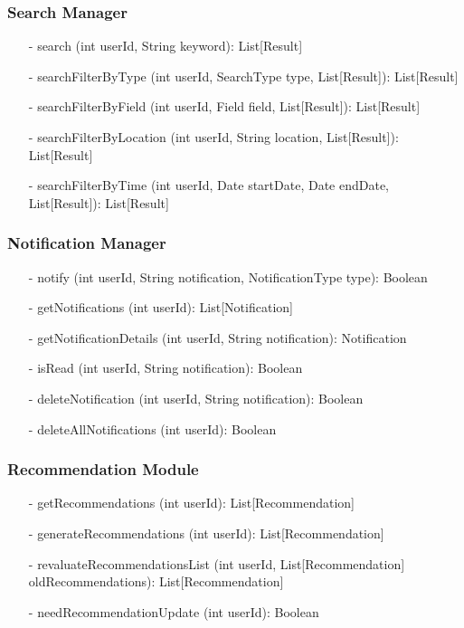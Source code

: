 \subsubsection{Search Manager}
\begin{itemize}
    \item[-] search (int userId, String keyword): List[Result]
    \item[-] searchFilterByType (int userId, SearchType type, List[Result]): List[Result]
    \item[-] searchFilterByField (int userId, Field field, List[Result]): List[Result]
    \item[-] searchFilterByLocation (int userId, String location, List[Result]): List[Result]
    \item[-] searchFilterByTime (int userId, Date startDate, Date endDate, List[Result]): List[Result]
\end{itemize}


\subsubsection{Notification Manager}
\begin{itemize}
    \item[-] notify (int userId, String notification, NotificationType type): Boolean
    \item[-] getNotifications (int userId): List[Notification]
    \item[-] getNotificationDetails (int userId, String notification): Notification
    \item[-] isRead (int userId, String notification): Boolean
    \item[-] deleteNotification (int userId, String notification): Boolean
    \item[-] deleteAllNotifications (int userId): Boolean
\end{itemize}


\subsubsection{Recommendation Module}
\begin{itemize}
    \item[-] getRecommendations (int userId): List[Recommendation]
    \item[-] generateRecommendations (int userId): List[Recommendation]
    \item[-] revaluateRecommendationsList (int userId, List[Recommendation] 
    oldRecommendations): List[Recommendation]
    \item[-] needRecommendationUpdate (int userId): Boolean
\end{itemize}


